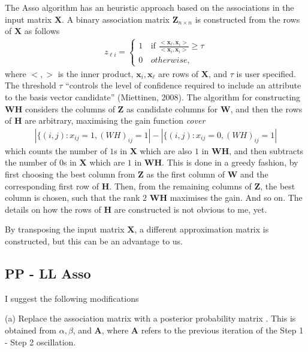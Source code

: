 \documentclass[12pt]{article}
\begin{document}
The Asso algorithm \cite{Miettinen2008Discrete} \cite{Miettinen2014MDL4BMF} has an heuristic approach based on the associations in the input matrix $\mathbf{X}$. 
A binary association matrix $\mathbf{Z}_{n \times n}$ is constructed from the rows of $\mathbf{X}$ as follows
\begin{align} \label{eq:Association}
  z_{\ell i} =
   \begin{cases}
      1 & \text{if } \frac{<\mathbf{x}_{\ell},\mathbf{x}_i>}{<\mathbf{x}_{i},\mathbf{x}_{i}>} \geq \tau \\
      0 \, &otherwise,
    \end{cases}
\end{align}
where $<,>$ is the inner product, $\mathbf{x}_i,\mathbf{x}_{\ell}$ are rows of $\mathbf{X}$, and $\tau$ is user specified.
The threshold $\tau$ ``controls the level of confidence required to include an attribute to the basis vector candidate'' (Miettinen, 2008). 
The algorithm for constructing $\mathbf{WH}$ considers the columns of $\mathbf{Z}$ as candidate columns for $\mathbf{W}$, and then the rows of $\mathbf{H}$ are arbitrary, maximising the gain function {\it cover}
\begin{align}
   | \{ (i,j) : x_{ij} = 1, (WH)_{ij} = 1| - | \{ (i,j) : x_{ij} = 0, (WH)_{ij} = 1|
\end{align}
which counts the number of $1$s in $\mathbf{X}$ which are also $1$ in $\mathbf{WH}$, and then subtracts the number of $0$s in $\mathbf{X}$ which are $1$ in $\mathbf{WH}$.
This is done in a greedy fashion, by first choosing the best column from $\mathbf{Z}$ as the first column of $\mathbf{W}$ and the corresponding first row of $\mathbf{H}$.
Then, from the remaining columns of  $\mathbf{Z}$, the best column is chosen, such that the rank $2$ $\mathbf{WH}$ maximises the gain. 
And so on.
The details on how the rows  of $\mathbf{H}$ are constructed is not obvious to me, yet. 

By transposing the input matrix $\mathbf{X}$, a different approximation matrix is constructed, but this can be an advantage to us. 

\subsection{PP -  LL Asso} %

I suggest the following modifications 

(a) Replace the association matrix with a posterior probability matrix \cite{Agrawal1993Mining}. This is obtained from $\alpha, \beta$, and $\mathbf{A}$, where $\mathbf{A}$ refers to the previous iteration of the Step 1 - Step 2 oscillation.
\end{document}
